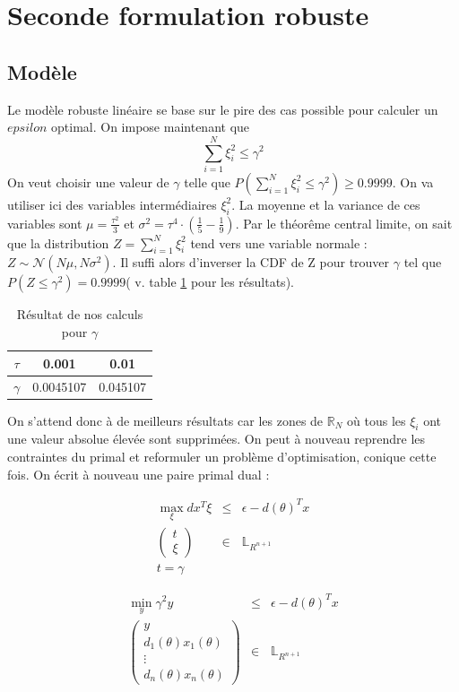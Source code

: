 \section{Seconde formulation robuste}
\subsection{Modèle}
Le modèle robuste linéaire se base sur le pire des cas possible pour calculer un $epsilon$ optimal. On impose maintenant que
$$\sum_{i=1}^N \xi_i^2 \leq \gamma^2$$
On veut choisir une valeur de $\gamma$ telle que $P(\sum_{i=1}^N \xi_i^2 \leq \gamma^2)\geq 0.9999$. On va utiliser ici des variables intermédiaires $\xi_i^2$. La moyenne et la variance de ces variables sont $\mu = \frac{\tau^2}{3}$ et $\sigma^2 = \tau^4\cdot(\frac{1}{5}-\frac{1}{9})$.
Par le théorême central limite, on sait que la distribution $Z = \sum_{i=1}^N \xi_i^2$ tend vers une variable normale : $Z\sim \mathcal{N}(N\mu, N\sigma^2)$. Il suffi alors d'inverser la CDF de Z pour trouver $\gamma$ tel que $P(Z\leq \gamma^2)=0.9999$( v. table \ref{gamma} pour les résultats).
\begin{table}
\centering
\begin{tabular}{|c|c|c|}
\hline
$\tau$ & 0.001 & 0.01 \\
\hline
$\gamma$ & 0.0045107 & 0.045107 \\
\hline
\end{tabular}
\caption{Résultat de nos calculs pour $\gamma$}
\label{gamma}
\end{table}
On s'attend donc à de meilleurs résultats car les zones de $\mathbb{R}_N$ où tous les $\xi_i$ ont une valeur absolue élevée sont supprimées.
On peut à nouveau reprendre les contraintes du primal et reformuler un problème d'optimisation, conique cette fois. On écrit à nouveau une paire primal dual :
\begin{center}
\begin{minipage}{0.4\textwidth}
\begin{eqnarray}
\max_{\xi} dx^T \xi & \leq & \epsilon - d(\theta)^Tx \nonumber \\
\begin{pmatrix}t \\ \xi \end{pmatrix} & \in  & \mathbb{L}_{R^{n+1}} \nonumber \\ 
t = \gamma \nonumber
\end{eqnarray}
\end{minipage}
\begin{minipage}{0.4\textwidth}
\begin{eqnarray*}
\min_{y} \gamma^2 y & \leq & \epsilon - d(\theta)^Tx \\
\begin{pmatrix}
y \\
d_1(\theta)x_1(\theta) \\
\vdots \\
d_n(\theta)x_n(\theta)
\end{pmatrix}
 & \in & \mathbb{L}_{R^{n+1}}
\end{eqnarray*}
\end{minipage}
\end{center}
